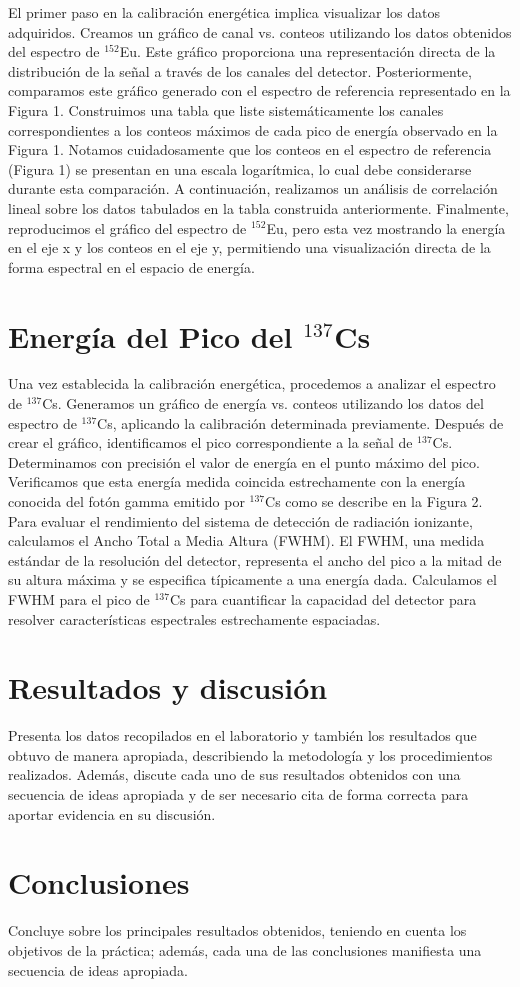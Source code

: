 \documentclass[twocolumn,a4paper,11pt]{scrartcl}
\begin{document}
El primer paso en la calibración energética implica visualizar los datos adquiridos. Creamos un gráfico de canal vs. conteos utilizando los datos obtenidos del espectro de $^{152}$Eu. Este gráfico proporciona una representación directa de la distribución de la señal a través de los canales del detector.  Posteriormente, comparamos este gráfico generado con el espectro de referencia representado en la Figura 1. Construimos una tabla que liste sistemáticamente los canales correspondientes a los conteos máximos de cada pico de energía observado en la Figura 1. Notamos cuidadosamente que los conteos en el espectro de referencia (Figura 1) se presentan en una escala logarítmica, lo cual debe considerarse durante esta comparación.  A continuación, realizamos un análisis de correlación lineal sobre los datos tabulados en la tabla construida anteriormente. Finalmente, reproducimos el gráfico del espectro de $^{152}$Eu, pero esta vez mostrando la energía en el eje x y los conteos en el eje y, permitiendo una visualización directa de la forma espectral en el espacio de energía.

\section{Energía del Pico del $^{137}$Cs}

Una vez establecida la calibración energética, procedemos a analizar el espectro de $^{137}$Cs. Generamos un gráfico de energía vs. conteos utilizando los datos del espectro de $^{137}$Cs, aplicando la calibración determinada previamente. Después de crear el gráfico, identificamos el pico correspondiente a la señal de $^{137}$Cs. Determinamos con precisión el valor de energía en el punto máximo del pico. Verificamos que esta energía medida coincida estrechamente con la energía conocida del fotón gamma emitido por $^{137}$Cs como se describe en la Figura 2. Para evaluar el rendimiento del sistema de detección de radiación ionizante, calculamos el Ancho Total a Media Altura (FWHM). El FWHM, una medida estándar de la resolución del detector, representa el ancho del pico a la mitad de su altura máxima y se especifica típicamente a una energía dada. Calculamos el FWHM para el pico de $^{137}$Cs para cuantificar la capacidad del detector para resolver características espectrales estrechamente espaciadas.

\section{Resultados y discusión}
Presenta los datos recopilados en el laboratorio y también los resultados que obtuvo de manera apropiada, describiendo la metodología y los procedimientos realizados. Además, discute cada uno de sus resultados obtenidos con una secuencia de ideas apropiada y de ser necesario cita de forma correcta para aportar evidencia en su discusión.


\section{Conclusiones}
Concluye sobre los principales resultados obtenidos, teniendo en cuenta los objetivos de la práctica; además, cada una de las conclusiones manifiesta una secuencia de ideas apropiada.


 
\end{document}
